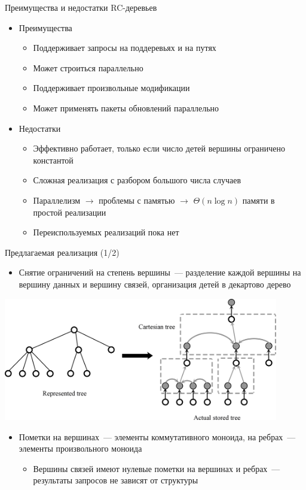 \documentclass[hyperref=unicode,graphics=pdflatex,13pt]{beamer}
\begin{document}
\begin{frame}[shrink]{Преимущества и недостатки RC-деревьев}
\begin{itemize}
        \item Преимущества
	\begin{itemize}
    		\item Поддерживает запросы на поддеревьях и на путях
		\item Может строиться параллельно
		\item Поддерживает произвольные модификации
		\item Может применять пакеты обновлений параллельно
	\end{itemize}
\end{itemize}
\begin{itemize}
        \item Недостатки
	\begin{itemize}
	    \item Эффективно работает, только если число детей вершины ограничено константой
	    \item Сложная реализация с разбором большого числа случаев
	    \item Параллелизм $\to$ проблемы с памятью $\to$ $\Theta(n \log n)$ памяти в простой реализации
	    \item Переиспользуемых реализаций пока нет
	\end{itemize}
\end{itemize}
\end{frame}

\begin{frame}[shrink]{Предлагаемая реализация (1/2)}
\begin{itemize}
    \item Снятие ограничений на степень вершины~--- разделение каждой вершины на вершину данных и вершину связей,
          организация детей в декартово дерево
\end{itemize}
\begin{center}
\includegraphics[width=0.9\textwidth]{picture/represented_tree_and_actual_stored_tree.png}
\end{center}
\begin{itemize}
    \item Пометки на вершинах~--- элементы коммутативного моноида, на ребрах~--- элементы 
          произвольного моноида
    \begin{itemize}
        \item Вершины связей имеют нулевые пометки на вершинах и ребрах~--- результаты запросов
              не зависят от структуры
    \end{itemize}
\end{itemize}
\end{frame}
\end{document}

